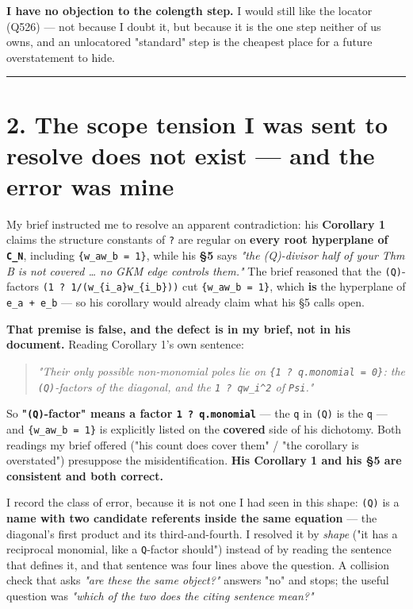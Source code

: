 \documentclass[11pt,a4paper]{article}
\begin{document}
\textbf{I have no objection to the colength step.} I would still like the locator (Q526) --- not because I doubt it, but because it is the one step neither of us owns, and an unlocatored "standard" step is the cheapest place for a future overstatement to hide.

\medskip\hrule\medskip

\section*{2. The scope tension I was sent to resolve does not exist --- and the error was mine}

My brief instructed me to resolve an apparent contradiction: his \textbf{Corollary 1} claims the structure constants of \mbox{\texttt{?}} are regular on \textbf{every root hyperplane of \mbox{\texttt{C\_N}}}, including \mbox{\texttt{\{w\_aw\_b = 1\}}}, while his \textbf{\S{}5} says \emph{"the (Q)-divisor half of your Thm B is not covered \dots{} no GKM edge controls them."} The brief reasoned that the \mbox{\texttt{(Q)}}-factors \mbox{\texttt{(1 ? 1/(w\_\{i\_a\}w\_\{i\_b\}))}} cut \mbox{\texttt{\{w\_aw\_b = 1\}}}, which \textbf{is} the hyperplane of \mbox{\texttt{e\_a + e\_b}} --- so his corollary would already claim what his \S{}5 calls open.

\textbf{That premise is false, and the defect is in my brief, not in his document.} Reading Corollary 1's own sentence:

\begin{quote}\itshape \emph{"Their only possible non-monomial poles lie on \mbox{\texttt{\{1 ? q.monomial = 0\}}}: the \mbox{\texttt{(Q)}}-factors of the diagonal, and the \mbox{\texttt{1 ? qw\_i\textasciicircum{}2}} of \mbox{\texttt{Psi}}."}\end{quote}

So \textbf{"\mbox{\texttt{(Q)}}-factor" means a factor \mbox{\texttt{1 ? q.monomial}}} --- the \mbox{\texttt{q}} in \mbox{\texttt{(Q)}} is the \mbox{\texttt{q}} --- and \mbox{\texttt{\{w\_aw\_b = 1\}}} is explicitly listed on the \textbf{covered} side of his dichotomy. Both readings my brief offered ("his count does cover them" / "the corollary is overstated") presuppose the misidentification. \textbf{His Corollary 1 and his \S{}5 are consistent and both correct.}

I record the class of error, because it is not one I had seen in this shape: \mbox{\texttt{(Q)}} is a \textbf{name with two candidate referents inside the same equation} --- the diagonal's first product and its third-and-fourth. I resolved it by \emph{shape} ("it has a reciprocal monomial, like a \mbox{\texttt{Q}}-factor should") instead of by reading the sentence that defines it, and that sentence was four lines above the question. A collision check that asks \emph{"are these the same object?"} answers "no" and stops; the useful question was \emph{"which of the two does the citing sentence mean?"}
\end{document}
